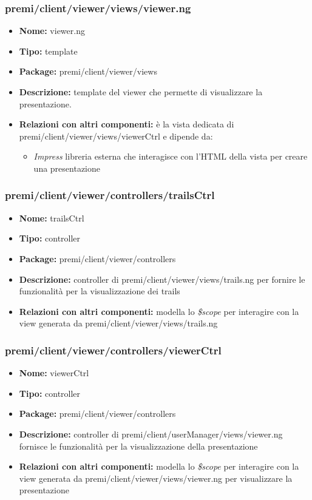 \subsubsection{premi/client/viewer/views/viewer.ng}
\begin{itemize}
  \item[] \textbf{Nome:} viewer.ng
  \item[] \textbf{Tipo:} template
  \item[] \textbf{Package:} premi/client/viewer/views
  \item[] \textbf{Descrizione:} template del viewer che permette di visualizzare la presentazione.
  \item[] \textbf{Relazioni con altri componenti:} è la vista dedicata di premi/client/viewer/views/viewerCtrl e dipende da:
  \begin{itemize}
  	\item \textit{Impress} libreria esterna che interagisce con l'HTML della vista per creare una presentazione
  \end{itemize}
\end{itemize}
\subsubsection{premi/client/viewer/controllers/trailsCtrl}
\begin{itemize}
  \item[] \textbf{Nome:} trailsCtrl
  \item[] \textbf{Tipo:} controller
  \item[] \textbf{Package:} premi/client/viewer/controllers
  \item[] \textbf{Descrizione:} controller di premi/client/viewer/views/trails.ng per fornire le funzionalità per la visualizzazione dei trails
  \item[] \textbf{Relazioni con altri componenti:} modella lo \textit{\$scope} per interagire con la view generata da premi/client/viewer/views/trails.ng
\end{itemize}
\subsubsection{premi/client/viewer/controllers/viewerCtrl}
\begin{itemize}
  \item[] \textbf{Nome:} viewerCtrl
  \item[] \textbf{Tipo:} controller
  \item[] \textbf{Package:} premi/client/viewer/controllers
  \item[] \textbf{Descrizione:} controller di premi/client/userManager/views/viewer.ng fornisce le funzionalità per la visualizzazione della presentazione
  \item[] \textbf{Relazioni con altri componenti:} modella lo \textit{\$scope} per interagire con la view generata da premi/client/viewer/views/viewer.ng per visualizzare la presentazione
\end{itemize}

